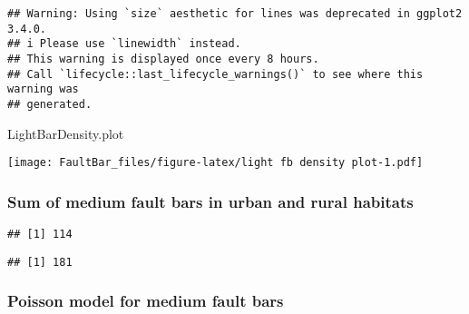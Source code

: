 \documentclass[
]{article}
\newenvironment{Shaded}{\begin{snugshade}}{\end{snugshade}}
\newcommand{\FunctionTok}[1]{\textcolor[rgb]{0.13,0.29,0.53}{\textbf{#1}}}
\newcommand{\NormalTok}[1]{#1}
\newcommand{\SpecialCharTok}[1]{\textcolor[rgb]{0.81,0.36,0.00}{\textbf{#1}}}
\newcommand{\StringTok}[1]{\textcolor[rgb]{0.31,0.60,0.02}{#1}}
\begin{document}
\begin{verbatim}
## Warning: Using `size` aesthetic for lines was deprecated in ggplot2 3.4.0.
## i Please use `linewidth` instead.
## This warning is displayed once every 8 hours.
## Call `lifecycle::last_lifecycle_warnings()` to see where this warning was
## generated.
\end{verbatim}

\begin{Shaded}
\begin{Highlighting}[]
\NormalTok{LightBarDensity.plot}
\end{Highlighting}
\end{Shaded}

\texttt{[image: FaultBar\_files/figure-latex/light fb density plot-1.pdf]}

\subsubsection{Sum of medium fault bars in urban and rural
habitats}\label{sum-of-medium-fault-bars-in-urban-and-rural-habitats}

\begin{Shaded}
\end{Shaded}

\begin{verbatim}
## [1] 114
\end{verbatim}

\begin{Shaded}
\end{Shaded}

\begin{verbatim}
## [1] 181
\end{verbatim}

\subsubsection{Poisson model for medium fault
bars}\label{poisson-model-for-medium-fault-bars}
\end{document}
